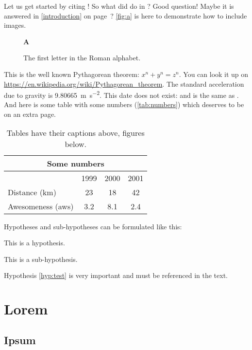 Let us get started by citing \cite{BeckKKF13}!
So what did \citeauthor{BeckKKF13} do in \citeyear{BeckKKF13}?
Good question!
Maybe it is answered in \cref{introduction} on page~\pageref{introduction}?
\autoref{fig:a} is here to demonstrate how to include images.
\begin{figure}[bt]%
  \begin{center}{\huge\bfseries A}\end{center}
  \caption{The first letter in the Roman alphabet.}\label{fig:a}
\end{figure}
This is the well known Pythagorean theorem: $x^n + y^n = z^n$.
You can look it up on \url{https://en.wikipedia.org/wiki/Pythagorean_theorem}.
The standard acceleration due to gravity is \SI{9.80665}{\m\per\second\squared}.
This date does not exist: 
and is the same as .
And here is some table with some numbers (\autoref{tab:numbers})
which deserves to be on an extra page.

\begin{table}[p]%
  \caption{Tables have their captions above, figures below.}
  \begin{center}
    \begin{tabular}{lccc}\toprule
      \multicolumn{4}{c}{Some numbers}       \\\midrule
                        & 1999 & 2000 & 2001 \\\cmidrule(l){2-4}
      Distance (km)     & 23   & 18   & 42   \\
      Awesomeness (aws) & 3.2  & 8.1  & 2.4  \\\bottomrule
    \end{tabular}
  \end{center}\label{tab:numbers}%
\end{table}

Hypotheses and sub-hypotheses can be formulated like this:
\begin{hypothesis}
\label{hyp:test}
This is a hypothesis.
\end{hypothesis}
\begin{shypothesis}
\label{shyp:test}
This is a sub-hypothesis.
\end{shypothesis}
Hypothesis \cref{hyp:test} is very important and must be referenced in the text.

\section{Lorem} \label{sec:lorem}
\lipsum[1-3]

\subsection{Ipsum} \label{ssec:ipsum}
\lipsum[4-7]
